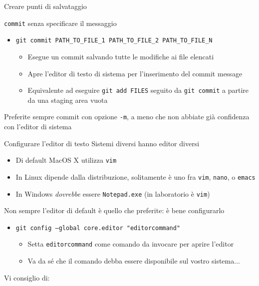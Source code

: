 \documentclass[xcolor=dvipsnames,presentation]{beamer}
\begin{document}
\begin{frame}{Creare punti di salvataggio}
\begin{block}{\texttt{commit} senza specificare il messaggio}
\begin{itemize}
\begin{itemize}
                \item Apre l'editor di testo di sistema per l'inserimento del commit message
            \end{itemize}
            \item \texttt{git commit PATH\_TO\_FILE\_1 PATH\_TO\_FILE\_2 PATH\_TO\_FILE\_N}
            \begin{itemize}
                \footnotesize
                \item Esegue un commit salvando tutte le modifiche ai file elencati
                \item Apre l'editor di testo di sistema per l'inserimento del commit message
                \item Equivalente ad eseguire \texttt{git add FILES} seguito da \texttt{git commit} a partire da una staging area vuota
            \end{itemize}
        \end{itemize}
        Preferite sempre commit con opzione \texttt{-m}, a meno che non abbiate già confidenza con
l'editor di sistema
    \end{block}
    \begin{block}{Configurare l'editor di testo}
        Sistemi diversi hanno editor diversi
        \begin{itemize}
            \item Di default MacOS X utilizza \texttt{vim}
            \item In Linux dipende dalla distribuzione, solitamente è uno fra \texttt{vim},
\texttt{nano}, o \texttt{emacs}
            \item In Windows \textit{dovrebbe} essere \texttt{Notepad.exe} (in laboratorio è
\texttt{vim})
        \end{itemize}
        Non sempre l'editor di default è quello che preferite: è bene configurarlo
        \begin{itemize}
            \item \texttt{git config --global core.editor "editorcommand"}
            \begin{itemize}
                \item Setta \texttt{editorcommand} come comando da invocare per aprire l'editor
                \item Va da sé che il comando debba essere disponibile sul vostro sistema...
            \end{itemize}
        \end{itemize}
        Vi consiglio di:
        \begin{itemize}

\end{itemize}
\end{block}
\end{frame}
\end{document}
